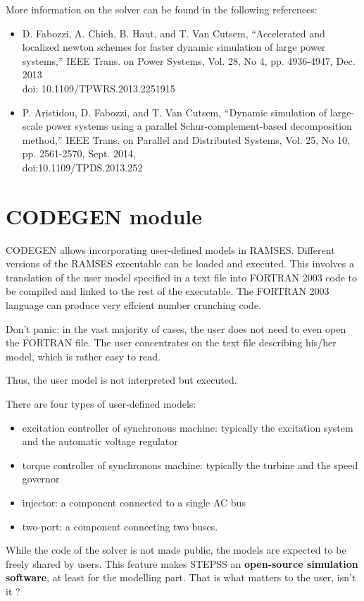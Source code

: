 More information on the solver can be found in the following references:
\begin{itemize}
\item{} D. Fabozzi, A. Chieh, B. Haut, and T. Van Cutsem, ``Accelerated and localized newton schemes for faster dynamic simulation of large power systems,'' IEEE Trans. on Power Systems, Vol. 28, No 4, pp. 4936-4947, Dec. 2013\\ doi: 10.1109/TPWRS.2013.2251915
\item{} P. Aristidou, D. Fabozzi, and T. Van Cutsem, ``Dynamic simulation of large-scale power systems using a parallel Schur-complement-based decomposition method,'' IEEE Trans. on Parallel and Distributed Systems, Vol. 25, No 10, pp. 2561-2570, Sept. 2014,\\ doi:10.1109/TPDS.2013.252
\end{itemize}

\section{CODEGEN module}\label{sec-codegen}

CODEGEN allows incorporating user-defined models in RAMSES. Different versions of the RAMSES executable can be loaded and executed. This involves a translation of the user model specified in a text file into FORTRAN 2003 code to be compiled and linked to the rest of the executable.  The FORTRAN 2003 language can produce very effcient number crunching code. 

Don't panic: in the vast majority of cases, the user does not need to even open the FORTRAN file. The user concentrates on the text file describing his/her model, which is rather easy to read.

Thus, the user model is not interpreted but executed.

There are four types of user-defined models:
\begin{itemize}
\item excitation controller of synchronous machine: typically the excitation system and the automatic voltage regulator
\item torque controller of synchronous machine: typically the turbine and the speed governor
\item injector: a component connected to a single AC bus
\item two-port: a component connecting two buses.
\end{itemize}

While the code of the solver is not made public, the models are expected to be freely shared by users.
This feature makes STEPSS an {\bf \large open-source simulation software}, at least for the modelling part. That is what matters to the user, isn't it ?



